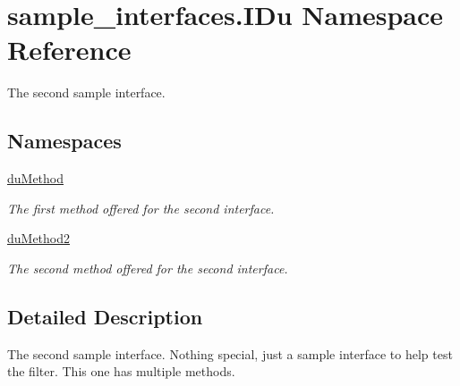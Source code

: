 \hypertarget{namespacesample__interfaces_1_1_i_du}{\section{sample\-\_\-interfaces.\-I\-Du Namespace Reference}
\label{namespacesample__interfaces_1_1_i_du}
}


The second sample interface.  


\subsection*{Namespaces}
\begin{DoxyCompactItemize}
\item 
\hyperlink{namespacesample__interfaces_1_1_i_du_1_1du_method}{du\-Method}
\begin{DoxyCompactList}\small\item\em The first method offered for the second interface. \end{DoxyCompactList}\item 
\hyperlink{namespacesample__interfaces_1_1_i_du_1_1du_method2}{du\-Method2}
\begin{DoxyCompactList}\small\item\em The second method offered for the second interface. \end{DoxyCompactList}\end{DoxyCompactItemize}


\subsection{Detailed Description}
The second sample interface. Nothing special, just a sample interface to help test the filter. This one has multiple methods. 
